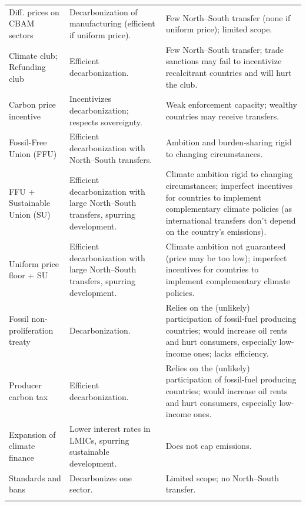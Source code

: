 \documentclass[12pt,english]{article}
\begin{document}
\begin{table}
{\begin{tabular}[t]{P{4cm}P{8cm}P{8cm}}
  Diff. prices on CBAM sectors  & Decarbonization of manufacturing (efficient if uniform price). & Few North--South transfer (none if uniform price); limited scope. \\
  Climate club; Refunding club  & Efficient decarbonization. & Few North--South transfer; trade sanctions may fail to incentivize recalcitrant countries and will hurt the club. \\
  Carbon price incentive & Incentivizes decarbonization; respects sovereignty. & Weak enforcement capacity; wealthy countries may receive transfers. \\
  Fossil-Free Union (FFU)  & Efficient decarbonization with North--South transfers. & Ambition and burden-sharing rigid to changing circumstances. \\
  FFU + Sustainable Union (SU)  & Efficient decarbonization with large North--South transfers, spurring development. & Climate ambition rigid to changing circumstances; imperfect incentives for countries to implement complementary climate policies (as international transfers don't depend on the country's emissions). \\
  Uniform price floor + SU  & Efficient decarbonization with large North--South transfers, spurring development.  & Climate ambition not guaranteed (price may be too low); imperfect incentives for countries to implement complementary climate policies. \\
  Fossil non-proliferation treaty  & Decarbonization. & Relies on the (unlikely) participation of fossil-fuel producing countries; would increase oil rents and hurt consumers, especially low-income ones; lacks efficiency. \\
  Producer carbon tax  & Efficient decarbonization. & Relies on the (unlikely) participation of fossil-fuel producing countries; would increase oil rents and hurt consumers, especially low-income ones. \\
  Expansion of climate finance  & Lower interest rates in LMICs, spurring sustainable development. & Does not cap emissions. \\
  Standards and bans  & Decarbonizes one sector. %
  & Limited scope; no North--South transfer. \\
  \bottomrule\\[-0.81em]
\end{tabular}}
\end{table}
\end{document}
